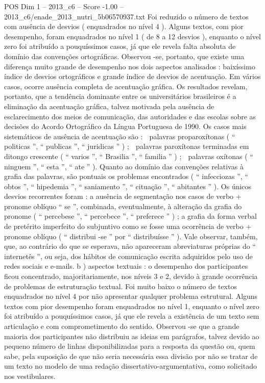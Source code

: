 \begin{textsample}{POS Dim 1 – 2013\_c6 – Score -1.00 – 2013\_c6/enade\_2013\_nutri\_5b06570937.txt}
Foi reduzido o número de textos com ausência de desvios ( enquadrados no nível 4 ).
Alguns textos, com pior desempenho, foram enquadrados no nível 1 ( de 8 a 12 desvios ), enquanto o nível zero foi atribuído a pouquíssimos casos, já que ele revela falta absoluta de domínio das convenções ortográficas.
Observou -se, portanto, que existe uma diferença muito grande de desempenho nos dois aspectos analisados : baixíssimo índice de desvios ortográficos e grande índice de desvios de acentuação.
Em vários casos, ocorre ausência completa de acentuação gráfica.
Os resultados revelam, portanto, que a tendência dominante entre os universitários brasileiros é a eliminação da acentuação gráfica, talvez motivada pela ausência de esclarecimento dos meios de comunicação, das autoridades e das escolas sobre as decisões do Acordo Ortográfico da Língua Portuguesa de 1990.
Os casos mais sistemáticos de ausência de acentuação são :  palavras proparoxítonas ( “ politicas ”, “ publicas ”, “ juridicas ” ) ;  palavras paroxítonas terminadas em ditongo crescente ( “ varios ”, “ Brasilia ”, “ familia ” ) ;  palavras oxítonas ( “ ninguem ”, “ esta ”, “ ate ” ).
Quanto ao domínio das convenções relativas à grafia das palavras, são pontuais os problemas encontrados ( “ infecciozas ”, “ obtos ”, “ hipedemia ”, “ saniamento ”, “ cituação ”, “ abitantes ” ).
Os únicos desvios recorrentes foram : a ausência de segmentação nos casos de verbo + pronome oblíquo “ se ”, combinada, eventualmente, à alteração da grafia do pronome ( “ percebese ”, “ percebece ”, “ preferece ” ) ; a grafia da forma verbal de pretérito imperfeito do subjuntivo como se fosse uma ocorrência de verbo + pronome oblíquo ( “ distribui -se ” por “ distribuísse ” ).
Vale observar, também, que, ao contrário do que se esperava, não apareceram abreviaturas próprias do “ internetês ”, ou seja, dos hábitos de comunicação escrita adquiridos pelo uso de redes sociais e e-mails. b ) aspectos textuais : o desempenho dos participantes ficou concentrado, majoritariamente, nos níveis 3 e 2, devido à grande ocorrência de problemas de estruturação textual.
Foi muito baixo o número de textos enquadrados no nível 4 por não apresentar qualquer problema estrutural.
Alguns textos com pior desempenho foram enquadrados no nível 1, enquanto o nível zero foi atribuído a pouquíssimos casos, já que ele revela a existência de um texto sem articulação e com comprometimento do sentido.
Observou -se que a grande maioria dos participantes não distribuiu as ideias em parágrafos, talvez devido ao pequeno número de linhas disponibilizadas para a resposta da questão ou, quem sabe, pela suposição de que não seria necessária essa divisão por não se tratar de um texto no modelo de uma redação dissertativo-argumentativa, como solicitado nos vestibulares.

\end{textsample}
